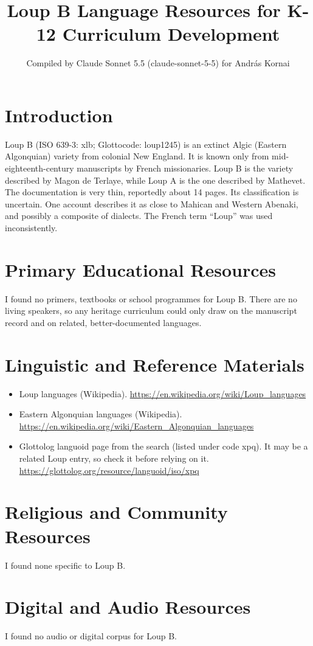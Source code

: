 \documentclass[12pt]{article}
\title{Loup B Language Resources for K-12 Curriculum Development}
\author{Compiled by Claude Sonnet 5.5 (claude-sonnet-5-5) for Andr\'as Kornai}
\date{}
\begin{document}
\maketitle

\section{Introduction}
Loup B (ISO 639-3: xlb; Glottocode: loup1245) is an extinct Algic (Eastern Algonquian) variety from colonial New England. It is known only from mid-eighteenth-century manuscripts by French missionaries. Loup B is the variety described by Magon de Terlaye, while Loup A is the one described by Mathevet. The documentation is very thin, reportedly about 14 pages. Its classification is uncertain. One account describes it as close to Mahican and Western Abenaki, and possibly a composite of dialects. The French term ``Loup'' was used inconsistently.

\section{Primary Educational Resources}
I found no primers, textbooks or school programmes for Loup B. There are no living speakers, so any heritage curriculum could only draw on the manuscript record and on related, better-documented languages.

\section{Linguistic and Reference Materials}
\begin{itemize}
\item Loup languages (Wikipedia). \url{https://en.wikipedia.org/wiki/Loup_languages}
\item Eastern Algonquian languages (Wikipedia). \url{https://en.wikipedia.org/wiki/Eastern_Algonquian_languages}
\item Glottolog languoid page from the search (listed under code xpq). It may be a related Loup entry, so check it before relying on it. \url{https://glottolog.org/resource/languoid/iso/xpq}
\end{itemize}

\section{Religious and Community Resources}
I found none specific to Loup B.

\section{Digital and Audio Resources}
I found no audio or digital corpus for Loup B.
\end{document}
